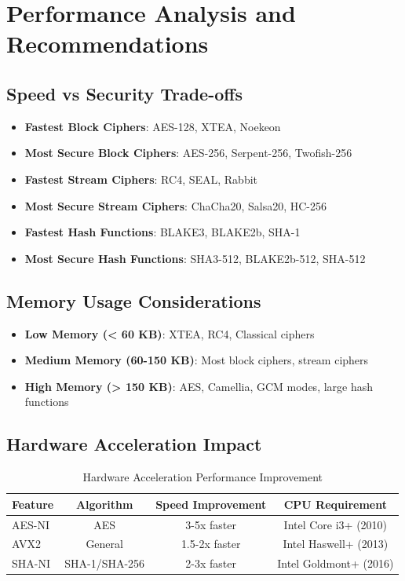 \documentclass[12pt,a4paper]{article}
\newcommand{\smalltable}[1]{\small #1}
\begin{document}
\section{Performance Analysis and Recommendations}

\subsection{Speed vs Security Trade-offs}

\begin{itemize}
    \item \textbf{Fastest Block Ciphers}: AES-128, XTEA, Noekeon
    \item \textbf{Most Secure Block Ciphers}: AES-256, Serpent-256, Twofish-256
    \item \textbf{Fastest Stream Ciphers}: RC4, SEAL, Rabbit
    \item \textbf{Most Secure Stream Ciphers}: ChaCha20, Salsa20, HC-256
    \item \textbf{Fastest Hash Functions}: BLAKE3, BLAKE2b, SHA-1
    \item \textbf{Most Secure Hash Functions}: SHA3-512, BLAKE2b-512, SHA-512
\end{itemize}

\subsection{Memory Usage Considerations}

\begin{itemize}
    \item \textbf{Low Memory (< 60 KB)}: XTEA, RC4, Classical ciphers
    \item \textbf{Medium Memory (60-150 KB)}: Most block ciphers, stream ciphers
    \item \textbf{High Memory (> 150 KB)}: AES, Camellia, GCM modes, large hash functions
\end{itemize}

\subsection{Hardware Acceleration Impact}

\begin{table}[h]
\centering
\smalltable{
\caption{Hardware Acceleration Performance Improvement}
\begin{tabular}{|l|c|c|c|}
\hline
\textbf{Feature} & \textbf{Algorithm} & \textbf{Speed Improvement} & \textbf{CPU Requirement} \\
\hline
AES-NI & AES & 3-5x faster & Intel Core i3+ (2010) \\
AVX2 & General & 1.5-2x faster & Intel Haswell+ (2013) \\
SHA-NI & SHA-1/SHA-256 & 2-3x faster & Intel Goldmont+ (2016) \\
\hline
\end{tabular}
}
\end{table}
\end{document}
